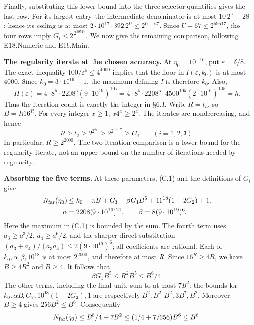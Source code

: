 \documentclass[english,11pt,a4paper]{article}
\begin{document}
Finally, substituting this lower bound into the three selector quantities gives the last row. For its largest entry, the intermediate denominator is at most \(10\,2^U+28\); hence its ceiling is at most \(2\cdot10^{17}\cdot392\,2^U\le2^{U+67}\). Since \(U+67\le2^{59517}\), the four rows imply \(G_i\le2^{\,2^{59517}}\). We now give the remaining comparison, following {\ttfamily\small E18.\discretionary{\hbox{\ensuremath{\hookrightarrow}}}{}{}Numeric} and {\ttfamily\small E19.\discretionary{\hbox{\ensuremath{\hookrightarrow}}}{}{}Main}.

\textbf{The regularity iterate at the chosen accuracy.} At \(\eta_0=10^{-16}\), put \(\varepsilon=\delta/8\). The exact inequality \(100/\varepsilon^5\le4^{4000}\) implies that the floor in \(I(\varepsilon,k_0)\) is at most \(4000\). Since \(k_0=3\cdot10^{19}+1\), the maximum defining \(I\) is therefore \(k_0\). Also, \[
H(\varepsilon)=4\cdot8^5\cdot2208^5(9\cdot10^{19})^{105}
=4\cdot8^5\cdot2208^5\cdot4500^{105}(2\cdot10^{16})^{105}=h.
\] Thus the iteration count is exactly the integer in §6.3. Write \(R=t_h\), so \(B=R16^R\). For every integer \(x\ge1\), \(x4^x\ge2^x\). The iterates are nondecreasing, and hence \[
R\ge t_2\ge2^{2^{k_0}}\ge2^{2^{59517}}\ge G_i
\qquad(i=1,2,3).
\] In particular, \(R\ge2^{2000}\). The two-iteration comparison is a lower bound for the regularity iterate, not an upper bound on the number of iterations needed by regularity.

\textbf{Absorbing the five terms.} At these parameters, (C.1) and the definitions of \(G_i\) give \[
\begin{aligned}
N_{\rm far}(\eta_0)\le{}& k_0+\alpha B+G_3+\beta G_1B^5
+10^{18}(1+2G_2)+1,\\
\alpha={}&2208(9\cdot10^{19})^{21},\qquad
\beta=8(9\cdot10^{19})^6.
\end{aligned}
\] Here the maximum in (C.1) is bounded by the sum. The fourth term uses \(a_3\ge a^3/2\), \(a_4\ge a^6/2\), and the sharper direct substitution \((a_3+a_4)/(a_3a_4)\le2(9\cdot10^{19})^6\); all coefficients are rational. Each of \(k_0,\alpha,\beta,10^{18}\) is at most \(2^{2000}\), and therefore at most \(R\). Since \(16^R\ge4R\), we have \(B\ge4R^2\) and \(B\ge4\). It follows that \[
\beta G_1B^5\le R^2B^5\le B^6/4.
\] The other terms, including the final unit, sum to at most \(7B^2\): the bounds for \(k_0,\alpha B,G_3,10^{18}(1+2G_2),1\) are respectively \(B^2,B^2,B^2,3B^2,B^2\). Moreover, \(B\ge4\) gives \(256B^2\le B^6\). Consequently \[
N_{\rm far}(\eta_0)\le B^6/4+7B^2
\le(1/4+7/256)B^6\le B^6.
\]
\end{document}
